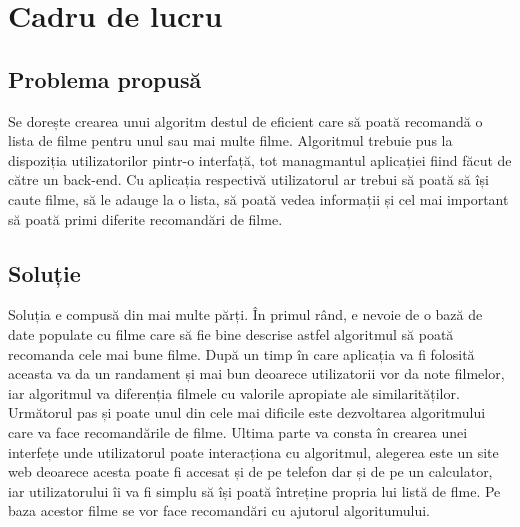 \chapter{Cadru de lucru }
\section{Problema propusă}
\label{sec:ch3sec1}

\par Se dorește crearea unui algoritm destul de eficient care să poată recomandă o lista de filme pentru unul sau mai multe filme. Algoritmul trebuie pus la dispoziția utilizatorilor pintr-o interfață, tot managmantul aplicației fiind făcut de către un back-end. Cu aplicația respectivă utilizatorul ar trebui să poată să își caute filme, să le adauge la o lista, să poată vedea informații și cel mai important să poată primi diferite recomandări de filme.


\section{Soluție}
\par Soluția e compusă din mai multe părți. În primul rând, e nevoie de o bază de date populate cu filme care să fie bine descrise astfel algoritmul să poată recomanda cele mai bune filme. După un timp în care aplicația va fi folosită aceasta va da un randament și mai bun deoarece utilizatorii vor da note filmelor, iar algoritmul va diferenția filmele cu valorile apropiate ale similarităților. Următorul pas și poate unul din cele mai dificile este dezvoltarea algoritmului care va face recomandările de filme. Ultima parte va consta în crearea unei interfețe unde utilizatorul poate interacționa cu algoritmul, alegerea este  un site web deoarece acesta poate fi accesat și de pe telefon dar și de pe un calculator, iar  utilizatorului îi va fi simplu să își  poată întreține propria lui listă de flme. Pe baza acestor filme se vor face recomandări cu ajutorul algoritumului.